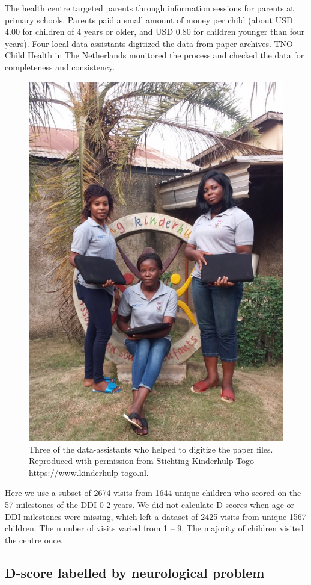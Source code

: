 \documentclass[
]{book}
\begin{document}
The health centre targeted parents through information sessions for parents at primary schools. Parents paid a small amount of money per child (about USD 4.00 for children of 4 years or older, and USD 0.80 for children younger than four years). Four local data-assistants digitized the data from paper archives. TNO Child Health in The Netherlands monitored the process and checked the data for completeness and consistency.

\begin{figure}

{\centering \includegraphics[width=0.6\linewidth]{fig/data_assistents} 

}

\caption{Three of the data-assistants who helped to digitize the paper files. Reproduced with permission from Stichting Kinderhulp Togo \url{https://www.kinderhulp-togo.nl}.}\label{fig:dataassistents}
\end{figure}



Here we use a subset of 2674 visits from 1644 unique children who scored on the 57 milestones of the DDI 0-2 years. We did not calculate D-scores when age or DDI milestones were missing, which left a dataset of 2425 visits from unique 1567 children. The number of visits varied from 1 -- 9. The majority of children visited the centre once.

\hypertarget{sec:togoneuro}{%
\subsection{D-score labelled by neurological problem}\label{sec:togoneuro}}
\end{document}
